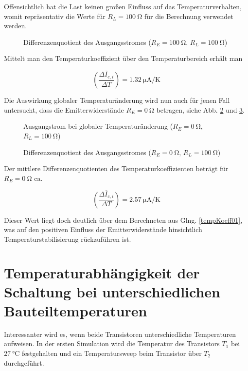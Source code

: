 Offensichtlich hat die Last keinen großen Einfluss auf das Temperaturverhalten, womit repräsentativ die Werte für $R_L = \SI{100}{\ohm}$ für die Berechnung verwendet werden.

\begin{figure}[H]
	\centering \small
	\scalebox{0.9}{}
	\caption{Differenzenquotient des Ausgangsstromes ($R_E = \SI{100}{\ohm}$, $R_L = \SI{100}{\ohm}$)}
	\label{fig_Kap4_07:T_2}
\end{figure}

Mittelt man den Temperaturkoeffizient über den Temperaturbereich erhält man

\begin{equation}
    \label{tempKoeff01}
    \overline{\left({\frac{\Delta I_{c,i}}{\Delta T}}\right)} = \SI{1.32}{\micro\ampere\per\kelvin}
\end{equation}

Die Auswirkung globaler Temperaturänderung wird nun auch für jenen Fall untersucht, dass die Emitterwiderstände $R_E = \SI{0}{\ohm}$ betragen, siehe Abb. \ref{fig_Kap4_061:T_1} und \ref{fig_Kap4_071:T_2}.

\begin{figure}[H]
	\centering \small
	\scalebox{0.9}{}
	\caption{Ausgangstrom bei globaler Temperaturänderung ($R_E = \SI{0}{\ohm}$, $R_L = \SI{100}{\ohm}$)}
	\label{fig_Kap4_061:T_1}
\end{figure}

\begin{figure}[H]
	\centering \small
	\scalebox{0.9}{}
	\caption{Differenzenquotient des Ausgangsstromes ($R_E = \SI{0}{\ohm}$, $R_L = \SI{100}{\ohm}$)}
	\label{fig_Kap4_071:T_2}
\end{figure}

Der mittlere Differenzenquotienten des Temperaturkoeffizienten beträgt für $R_E = \SI{0}{\ohm}$ ca. 

\begin{equation}
    \overline{\left({\frac{\Delta I_{c,i}}{\Delta T}}\right)} = \SI{2.57}{\micro\ampere\per\kelvin}
\end{equation}

Dieser Wert liegt doch deutlich über dem Berechneten aus Glng. \ref{tempKoeff01}, was auf den positiven Einfluss der Emitterwiderstände hinsichtlich Temperaturstabilisierung rückzuführen ist.

\section{Temperaturabhängigkeit der Schaltung bei unterschiedlichen Bauteiltemperaturen}
Interessanter wird es, wenn beide Transistoren unterschiedliche Temperaturen aufweisen. In der ersten Simulation wird die Temperatur des Transistors $T_1$ bei $\SI{27}{\celsius}$ festgehalten und ein Temperatursweep beim Transistor über $T_2$ durchgeführt.

